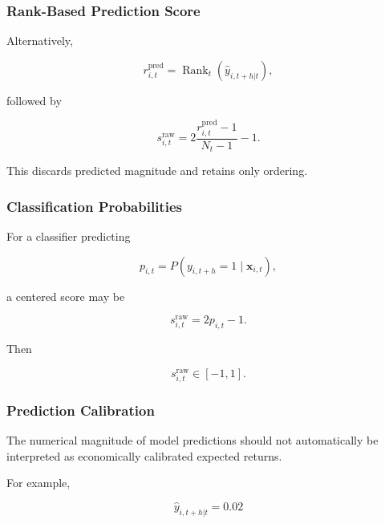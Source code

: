 \documentclass[11pt,a4paper]{article}
\begin{document}
\subsubsection{Rank-Based Prediction Score}

Alternatively,

\begin{equation}
r_{i,t}^{\mathrm{pred}}
=
\operatorname{Rank}_t
\left(
\widehat{y}_{i,t+h|t}
\right),
\end{equation}

followed by

\begin{equation}
\boxed{
s_{i,t}^{\mathrm{raw}}
=
2
\frac{
r_{i,t}^{\mathrm{pred}}-1
}{
N_t-1
}
-1.
}
\end{equation}

This discards predicted magnitude and retains only ordering.


\subsubsection{Classification Probabilities}

For a classifier predicting

\begin{equation}
p_{i,t}
=
P
\left(
y_{i,t+h}=1
\mid
\mathbf{x}_{i,t}
\right),
\end{equation}

a centered score may be

\begin{equation}
\boxed{
s_{i,t}^{\mathrm{raw}}
=
2p_{i,t}-1.
}
\end{equation}

Then

\begin{equation}
s_{i,t}^{\mathrm{raw}}
\in
[-1,1].
\end{equation}


\subsubsection{Prediction Calibration}

The numerical magnitude of model predictions should not automatically be
interpreted as economically calibrated expected returns.

For example,

\begin{equation}
\widehat{y}_{i,t+h|t}=0.02
\end{equation}
\end{document}
